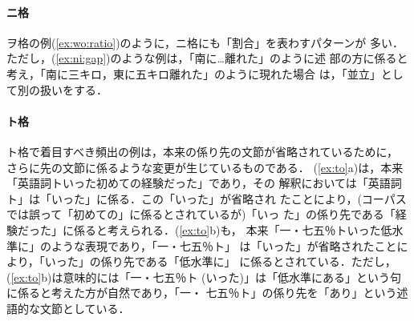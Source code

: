\paragraph{ニ格}
ヲ格の例(\ref{ex:wo:ratio})のように，ニ格にも「割合」を表わすパターンが
多い．
ただし，(\ref{ex:ni:gap})のような例は，「南に\dots 離れた」のように述
部の方に係ると考え，「南に三キロ，東に五キロ離れた」のように現れた場合
は，「並立」として別の扱いをする．

\paragraph{ト格}
ト格で着目すべき頻出の例は，本来の係り先の文節が省略されているために，
さらに先の文節に係るような変更が生じているものである．
(\ref{ex:to}a)は，本来「英語詞トいった初めての経験だった」であり，その
解釈においては「英語詞ト」は「いった」に係る．この「いった」が省略され
たことにより，(コーパスでは誤って「初めての」に係るとされているが)「いっ
た」の係り先である「経験だった」に係ると考えられる．(\ref{ex:to}b)も，
本来「一・七五％トいった低水準に」のような表現であり，「一・七五％ト」
は「いった」が省略されたことにより，「いった」の係り先である「低水準に」
に係るとされている．ただし，(\ref{ex:to}b)は意味的には「一・七五％ト
(いった)」は「低水準にある」という句に係ると考えた方が自然であり，「一・
七五％ト」の係り先を「あり」という述語的な文節としている．

